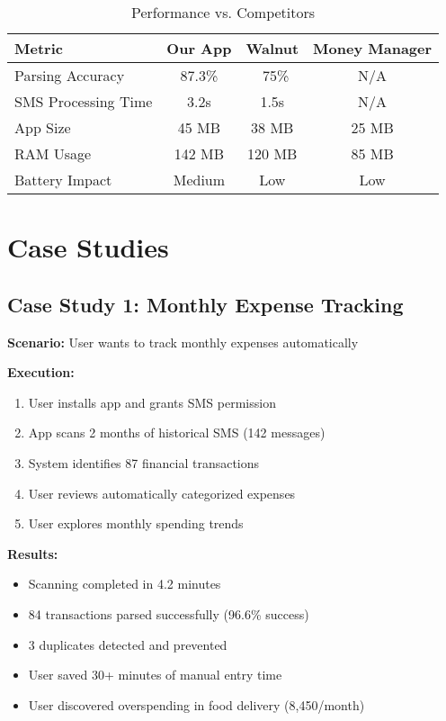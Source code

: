 \documentclass[11pt,a4paper]{report}
\begin{document}
\begin{table}[H]
\centering
\caption{Performance vs. Competitors}
\begin{tabular}{|l|c|c|c|}
\hline
\textbf{Metric} & \textbf{Our App} & \textbf{Walnut} & \textbf{Money Manager} \\
\hline
Parsing Accuracy & 87.3\% & ~75\% & N/A \\
SMS Processing Time & 3.2s & 1.5s & N/A \\
App Size & 45 MB & 38 MB & 25 MB \\
RAM Usage & 142 MB & 120 MB & 85 MB \\
Battery Impact & Medium & Low & Low \\
\hline
\end{tabular}
\end{table}

\section{Case Studies}

\subsection{Case Study 1: Monthly Expense Tracking}

\textbf{Scenario:} User wants to track monthly expenses automatically

\textbf{Execution:}
\begin{enumerate}
    \item User installs app and grants SMS permission
    \item App scans 2 months of historical SMS (142 messages)
    \item System identifies 87 financial transactions
    \item User reviews automatically categorized expenses
    \item User explores monthly spending trends
\end{enumerate}

\textbf{Results:}
\begin{itemize}
    \item Scanning completed in 4.2 minutes
    \item 84 transactions parsed successfully (96.6\% success)
    \item 3 duplicates detected and prevented
    \item User saved 30+ minutes of manual entry time
    \item User discovered overspending in food delivery (8,450/month)
\end{itemize}
\end{document}
